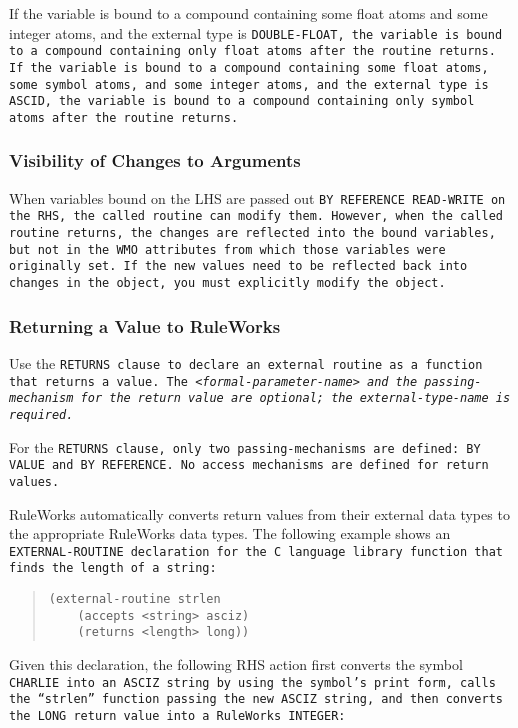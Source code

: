 If the variable is bound to a compound containing some float atoms and
some integer atoms, and the external type is \tt{DOUBLE-FLOAT}, the
variable is bound to a compound containing only float atoms after the
routine returns. If the variable is bound to a compound containing
some float atoms, some symbol atoms, and some integer atoms, and the
external type is \tt{ASCID}, the variable is bound to a compound containing
only symbol atoms after the routine returns.

\subsubsection{Visibility of Changes to Arguments}

When variables bound on the LHS are passed out \tt{BY REFERENCE
  READ-WRITE} on the RHS, the called routine can modify them. However,
when the called routine returns, the changes are reflected into the
bound variables, but not in the WMO attributes from which those
variables were originally set. If the new values need to be reflected
back into changes in the object, you must explicitly modify the
object.

\subsubsection{Returning a Value to RuleWorks}

Use the \tt{RETURNS} clause to declare an external routine as a
function that returns a value. The
\verb|<|\it{formal-parameter-name}\verb|>| and the passing-mechanism
for the return value are optional; the \it{external-type-name} is required.

For the \tt{RETURNS} clause, only two passing-mechanisms are defined:
\tt{BY VALUE} and \tt{BY REFERENCE}. No access mechanisms are defined
for return values.

RuleWorks automatically converts return values from their external
data types to the appropriate RuleWorks data types. The following
example shows an \tt{EXTERNAL-ROUTINE} declaration for the C language
library function that finds the length of a string:

\begin{quote}
\begin{verbatim}
(external-routine strlen
    (accepts <string> asciz)
    (returns <length> long))
\end{verbatim}
\end{quote}

Given this declaration, the following RHS action first converts the
symbol \tt{CHARLIE} into an \tt{ASCIZ} string by using the symbol's
print form, calls the ``\verb|strlen|'' function passing the new \tt{ASCIZ}
string, and then converts the \tt{LONG} return value into a RuleWorks
\tt{INTEGER}:

